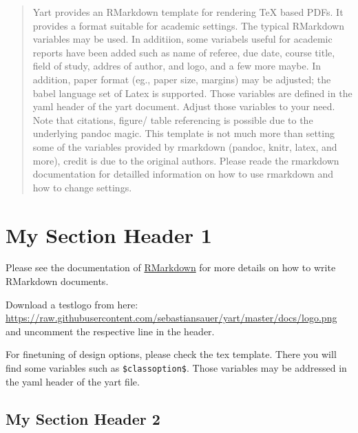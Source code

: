 \documentclass[11pt,ngerman,a4paper,oneside]{article}
\begin{document}
 \begin{abstract}
     Yart provides an RMarkdown template for rendering TeX based PDFs.
     It provides a format suitable for academic settings. The typical
     RMarkdown variables may be used. In additiion, some variabels
     useful for academic reports have been added such as name of
     referee, due date, course title, field of study, addres of author,
     and logo, and a few more maybe. In addition, paper format (eg.,
     paper size, margins) may be adjusted; the babel language set of
     Latex is supported. Those variables are defined in the yaml header
     of the yart document. Adjust those variables to your need. Note
     that citations, figure/ table referencing is possible due to the
     underlying pandoc magic. This template is not much more than
     setting some of the variables provided by rmarkdown (pandoc, knitr,
     latex, and more), credit is due to the original authors. Please
     reade the rmarkdown documentation for detailled information on how
     to use rmarkdown and how to change settings.
 \end{abstract}
 \newpage




\newpage
\listoftables
\newpage
\listoffigures

{
\setcounter{tocdepth}{3}
\tableofcontents
}

\newpage
{}
\hypertarget{my-section-header-1}{%
\section{My Section Header 1}\label{my-section-header-1}}

Please see the documentation of
\href{http://rmarkdown.rstudio.com/}{RMarkdown} for more details on how
to write RMarkdown documents.

Download a testlogo from here:
\url{https://raw.githubusercontent.com/sebastiansauer/yart/master/docs/logo.png}
and uncomment the respective line in the header.

For finetuning of design options, please check the tex template. There
you will find some variables such as \texttt{\$classoption\$}. Those
variables may be addressed in the yaml header of the yart file.

\hypertarget{my-section-header-2}{%
\subsection{My Section Header 2}\label{my-section-header-2}}
\end{document}

